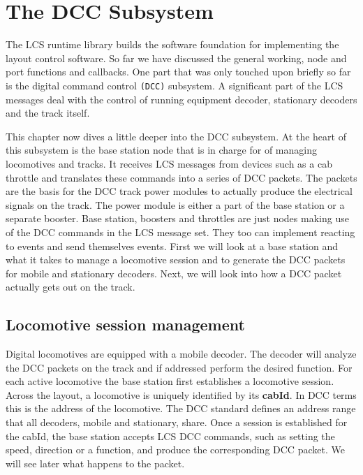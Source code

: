\chapter{The DCC Subsystem}

The LCS runtime library builds the software foundation for implementing the layout control software. So far we have discussed the general working, node and port functions and callbacks. One part that was only touched upon briefly so far is the digital command control \texttt{(DCC)} subsystem. A significant part of the LCS messages deal with the control of running equipment decoder, stationary decoders and the track itself.

This chapter now dives a little deeper into the DCC subsystem. At the heart of this subsystem is the base station node that is in charge for of managing locomotives and tracks. It receives LCS messages from devices such as a cab throttle and translates these commands into a series of DCC packets. The packets are the basis for the DCC track power modules to actually produce the electrical signals on the track. The power module is either a part of the base station or a separate booster. Base station, boosters and throttles are just nodes making use of the DCC commands in the LCS message set. They too can implement reacting to events and send themselves events. First we will look at a base station and what it takes to manage a locomotive session and to generate the DCC packets for mobile and stationary decoders. Next, we will look into how a DCC packet actually gets out on the track.

\section{Locomotive session management}

Digital locomotives are equipped with a mobile decoder. The decoder will analyze the DCC packets on the track and if addressed perform the desired function. For each active locomotive the base station first establishes a locomotive session. Across the layout, a locomotive is uniquely identified by its \textbf{cabId}. In DCC terms this is the address of the locomotive. The DCC standard defines an address range that all decoders, mobile and stationary, share. Once a session is established for the cabId, the base station accepts LCS DCC commands, such as setting the speed, direction or a function, and produce the corresponding DCC packet. We will see later what happens to the packet.

